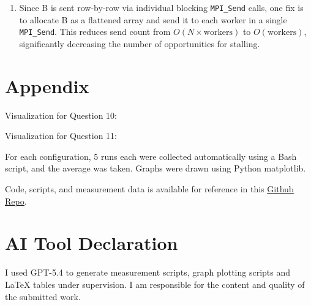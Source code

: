 \documentclass[12pt, a4paper]{article}
\begin{document}
\begin{enumerate}[start=10]
    The overcommitted run is $\sim$200$\times$ slower, with the slowdown entirely in communication. Worker computation time remains negligible given the small input size. With 9 processes across 4 cores, the OS must context-switch during the master's sequential blocking \lstinline|MPI_Send| calls. Each preemption stalls waiting workers longer, which in turn starves the master of CPU time, causing a feedback loop and consequently, the observed communication overhead.

  \item Since B is sent row-by-row via individual blocking \lstinline|MPI_Send| calls, one fix is to allocate B as a flattened array and send it to each worker in a single \lstinline|MPI_Send|. This reduces send count from $O(N \times \text{workers})$ to $O(\text{workers})$, significantly decreasing the number of opportunities for stalling.
\end{enumerate}
\pagebreak 

\section*{Appendix}
\lstset{style=bashstyle}

Visualization for Question 10:
\begin{center}
\end{center}

Visualization for Question 11:
\begin{center}
\end{center}

For each configuration, $5$ runs each were collected automatically using a Bash script, and the average was taken. Graphs were drawn using Python matplotlib.

Code, scripts, and measurement data is available for reference in this \underline{\href{https://github.com/Omgeta/nus-notes/tree/main/cs3210/tutorials/tutorial7}{Github Repo}}.

\section*{AI Tool Declaration}
I used GPT-5.4 to generate measurement scripts, graph plotting scripts and \LaTeX{} tables under supervision. I am responsible for the content and quality of the submitted work. 
\end{document}
